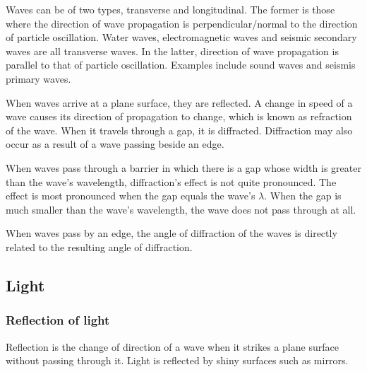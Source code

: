 Waves can be of two types, transverse and longitudinal. The former is those where the direction
of wave propagation is perpendicular/normal to the direction of particle oscillation.
Water waves, electromagnetic waves and seismic secondary waves are all transverse waves.
In the latter,
direction of wave propagation is parallel to that of particle oscillation.  Examples include
sound waves and seismis primary waves.

When waves arrive at a plane surface, they are reflected. A change in speed of a wave causes
its direction of propagation to change, which is known as refraction of the wave. When it 
travels through a gap, it is diffracted. Diffraction may also occur as a result of a wave
passing beside an edge.

When waves pass through a barrier in which there is a gap whose width is greater than the wave's
wavelength, diffraction's effect is not quite pronounced. The effect is most pronounced when the
gap equals the wave's $\lambda$. When the gap is much smaller than the wave's wavelength, the
wave does not pass through at all.

When waves pass by an edge, the angle of diffraction of the waves is directly related to the 
resulting angle of diffraction.

\subsection{Light}
\subsubsection{Reflection of light}
Reflection is the change of direction of a wave when it strikes a plane surface without passing
through it. Light is reflected by shiny surfaces such as mirrors.

\begin{center}
\end{center}

